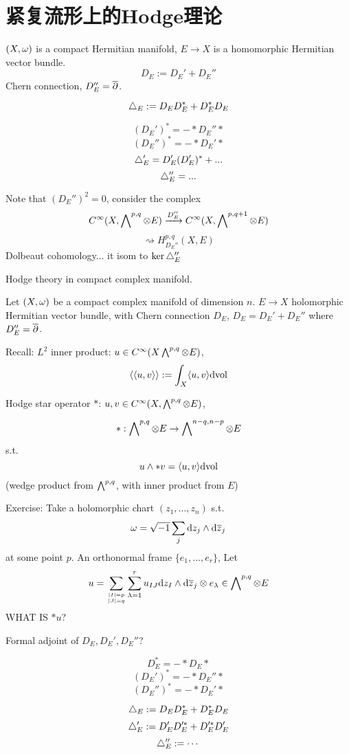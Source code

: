 \section{紧复流形上的Hodge理论}

$(X,\omega)$ is a compact Hermitian manifold,
$E\to X$ is a homomorphic Hermitian vector bundle.
$$D_E:=D_E'+D_E''$$
Chern connection, $D_E''=\overline{\partial}$.

\begin{definition}
$$\triangle_E:=D_ED_E^*+D_E^*D_E$$
\end{definition}
$$(D_E')^*=-*D_E''*$$
$$(D_E'')^*=-*D_E'*$$
$$\triangle_E'=D_E'(D_E')^*+...$$
$$\triangle_E''=...$$

Note that $(D_E'')^2=0$, consider the complex
$$C^\infty(X,\bigwedge\nolimits^{p,q}\otimes E)\xrightarrow{D_E''}C^\infty(X,\bigwedge\nolimits^{p,q+1}\otimes E)$$
$$\rightsquigarrow H^{p,q}_{D_E''}(X,E)$$
Dolbeaut cohomology...
it isom to $\ker\triangle_E''$


Hodge theory in compact complex manifold.

Let $(X,\omega)$ be a compact complex manifold of dimension $n$.
$E\to X$ holomorphic Hermitian vector bundle, with Chern connection $D_E$,
$D_E=D_E'+D_E''$ where $D_E''=\overline{\partial}$.

Recall: $L^2$ inner product: $u\in C^\infty(X\bigwedge\nolimits^{p,q}\otimes E)$,
$$\langle\langle u,v\rangle\rangle:=
\int_X\langle u,v\rangle
\mathrm{d}\text{vol}
$$

Hodge star operator $*$:
$u,v\in C^\infty(X,\bigwedge\nolimits^{p,q}\otimes E)$,
\begin{definition}
$$*:\bigwedge\nolimits^{p,q}\otimes E\to\bigwedge\nolimits^{n-q,n-p}\otimes E$$
s.t.
$$u\wedge *v=\langle u,v\rangle\mathrm{d}\text{vol}$$
(wedge product from $\bigwedge\nolimits^{p,q}$, with inner product from $E$)
\end{definition}

Exercise: Take a holomorphic chart $(z_1,...,z_n)$
s.t.
$$\omega=\sqrt{-1}\sum_j \mathrm{d} z_j\wedge\mathrm{d}\overline{z}_j$$
at some point $p$. An orthonormal frame
$\{e_1,...,e_r\}$, Let
$$u=\sum_{|I|=p\atop |J|=q}
\sum_{\lambda=1}^r
u_{IJ}\mathrm{d} z_I\wedge\mathrm{d}\overline{z}_j\otimes e_\lambda\in\bigwedge\nolimits^{p,q}\otimes E$$
WHAT IS $*u$?

Formal adjoint of $D_E,D_E',D_E''$?
\begin{prop}
$$D_E^*=-*D_E*$$
$$(D_E')^*=-*D_E''*$$
$$(D_E'')^*=-*D_E'*$$
\end{prop}

\begin{definition}
$$\triangle_E:=D_ED_E^*+D_E^*D_E$$
$$\triangle_E':=D_E'D_E'^*+D_E'^*D_E'$$
$$\triangle_E'':=\cdots$$
\end{definition}

